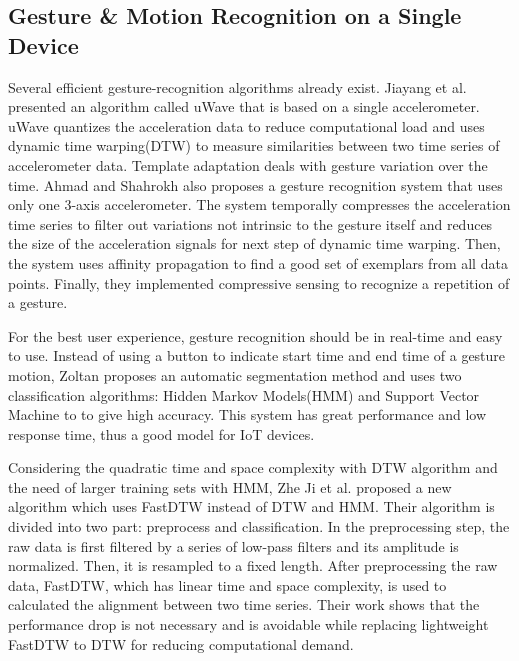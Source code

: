 
\subsection{Gesture \& Motion Recognition on a Single Device}

Several efficient gesture-recognition algorithms already exist. Jiayang et al. \cite{Liu:2009, LiuuWave} presented an algorithm called uWave that is based on a single accelerometer. uWave quantizes the acceleration data to reduce computational load and uses dynamic time warping(DTW) to measure similarities between two time series of accelerometer data. Template adaptation deals with gesture variation over the time. Ahmad and Shahrokh \cite{Ahmad:2010} also proposes a gesture recognition system that uses only one 3-axis accelerometer. The system temporally compresses the acceleration time series to filter out variations not intrinsic to the gesture itself and reduces the size of the acceleration signals for next step of dynamic time warping. Then, the system uses affinity propagation to find a good set of exemplars from all data points. Finally, they implemented compressive sensing to recognize a repetition of a gesture. 

For the best user experience, gesture recognition should be in real-time and easy to use. Instead of using a button to indicate start time and end time of a gesture motion, Zoltan \cite{Zoltan} proposes an automatic segmentation method and uses two classification algorithms: Hidden Markov Models(HMM) and Support Vector Machine to to give high accuracy. This system has great performance and low response time, thus a good model for \gls{IoT} devices.

Considering the quadratic time and space complexity with DTW algorithm and the need of larger training sets with HMM, Zhe Ji et al. \cite{Ji:2015} proposed a new algorithm which uses FastDTW instead of DTW and HMM. Their algorithm is divided into two part: preprocess and classification. In the preprocessing step, the raw data is first filtered by a series of low-pass filters and its amplitude is normalized. Then, it is resampled to a fixed length. After preprocessing the raw data, FastDTW, which has linear time and space complexity, is used to calculated the alignment between two time series. Their work shows that the performance drop is not necessary and is avoidable while replacing lightweight FastDTW to DTW for reducing computational demand.